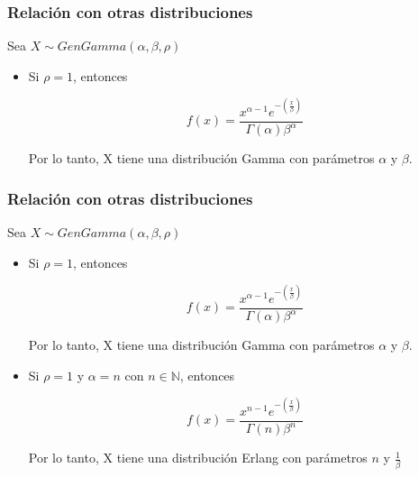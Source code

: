 \begin{frame}
    \frametitle{Relación con otras distribuciones}

    Sea $X \sim GenGamma(\alpha, \beta, \rho)$

    \begin{itemize}
        \item Si $\rho = 1$, entonces

        \begin{equation*}
            f(x) = \frac{x^{\alpha - 1} e^{-(\frac{x}{\beta})}}{\Gamma (\alpha ) \beta^\alpha}
        \end{equation*}

        Por lo tanto, X tiene una distribución Gamma con parámetros $\alpha$ y $\beta$.
    \end{itemize}
\end{frame}

\begin{frame}
    \frametitle{Relación con otras distribuciones}

    Sea $X \sim GenGamma(\alpha, \beta, \rho)$

    \begin{itemize}
        \item Si $\rho = 1$, entonces

        \begin{equation*}
            f(x) = \frac{x^{\alpha - 1} e^{-(\frac{x}{\beta})}}{\Gamma (\alpha ) \beta^\alpha}
        \end{equation*}

        Por lo tanto, X tiene una distribución Gamma con parámetros $\alpha$ y $\beta$.

        \vspace{0.5cm}

        \item Si $\rho = 1$ y $\alpha = n$ con $n \in \mathbb{N}$, entonces

        \begin{equation*}
            f(x) = \frac{x^{n - 1} e^{-(\frac{x}{\beta})}}{\Gamma (n ) \beta^n}
        \end{equation*}

        Por lo tanto, X tiene una distribución Erlang con parámetros $n$ y $\frac{1}{\beta}$
    \end{itemize}

    \cite{class}
\end{frame}

